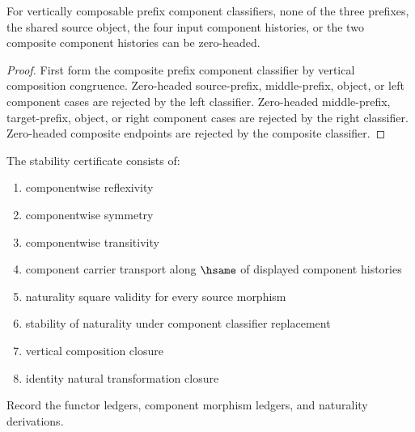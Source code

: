 \begin{theorem}
\label{thm:nattrans-prefix-component-classifier-vert-comp-zero-headed-component-absurd}
For vertically composable prefix component classifiers, none of the three
prefixes, the shared source object, the four input component histories, or the
two composite component histories can be zero-headed.
\end{theorem}
\begin{proof}
First form the composite prefix component classifier by vertical composition
congruence. Zero-headed source-prefix, middle-prefix, object, or left
component cases are rejected by the left classifier. Zero-headed middle-prefix,
target-prefix, object, or right component cases are rejected by the right
classifier. Zero-headed composite endpoints are rejected by the composite
classifier.
\end{proof}

\begin{definition}
\label{def:nattrans-stability-certificate}
The stability certificate consists of:
\begin{enumerate}
  \item componentwise reflexivity
  \item componentwise symmetry
  \item componentwise transitivity
  \item component carrier transport along $\hsame$ of displayed component histories
  \item naturality square validity for every source morphism
  \item stability of naturality under component classifier replacement
  \item vertical composition closure
  \item identity natural transformation closure
\end{enumerate}
\end{definition}

\begin{definition}
\label{def:nattrans-ledger-policy}
Record the functor ledgers, component morphism ledgers, and naturality derivations.
\end{definition}

